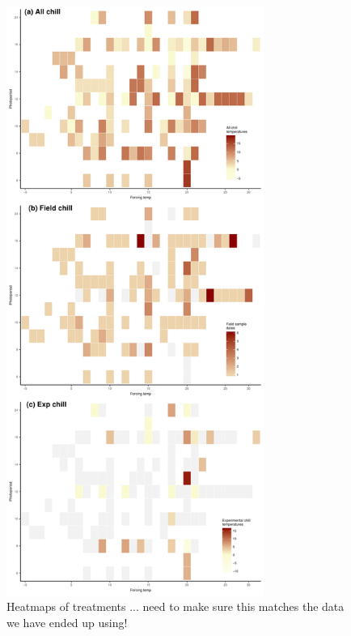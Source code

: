 \documentclass{article}
\begin{document}
\newpage
\begin{figure}[h!]
\centering
\noindent \includegraphics[width=0.75\textwidth]{..//..//analyses/bb_analysis/figures/studydesign_heat3panel.pdf}
\caption{Heatmaps of treatments ... need to make sure this matches the data we have ended up using!}
\label{fig:treatheatmaps} %
\end{figure}
\end{document}
